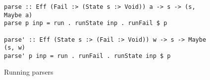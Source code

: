   \begin{figure}[h]
  \begin{lstlisting}
parse :: Eff (Fail :> (State s :> Void)) a -> s -> (s, Maybe a)
parse p inp = run . runState inp . runFail $ p

parse' :: Eff (State s :> (Fail :> Void)) w -> s -> Maybe (s, w)
parse' p inp = run . runFail . runState inp $ p
  \end{lstlisting}
  \caption{Running parsers}
  \label{listing:extEffparse}
  \end{figure}